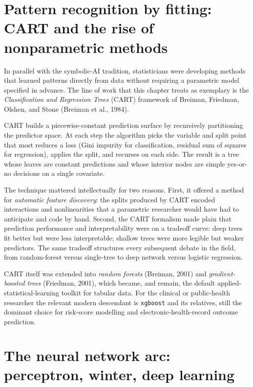 \documentclass[
  letterpaper,
  11pt]{scrbook}
\begin{document}
\section{Pattern recognition by fitting: CART and the rise of
nonparametric
methods}\label{pattern-recognition-by-fitting-cart-and-the-rise-of-nonparametric-methods}

In parallel with the symbolic-AI tradition, statisticians were
developing methods that learned patterns directly from data without
requiring a parametric model specified in advance. The line of work that
this chapter treats as exemplary is the \emph{Classification and
Regression Trees} (CART) framework of Breiman, Friedman, Olshen, and
Stone (Breiman et al., 1984).

CART builds a piecewise-constant prediction surface by recursively
partitioning the predictor space. At each step the algorithm picks the
variable and split point that most reduces a loss (Gini impurity for
classification, residual sum of squares for regression), applies the
split, and recurses on each side. The result is a tree whose leaves are
constant predictions and whose interior nodes are simple yes-or-no
decisions on a single covariate.

The technique mattered intellectually for two reasons. First, it offered
a method for \emph{automatic feature discovery}: the splits produced by
CART encoded interactions and nonlinearities that a parametric
researcher would have had to anticipate and code by hand. Second, the
CART formalism made plain that prediction performance and
interpretability were on a tradeoff curve: deep trees fit better but
were less interpretable; shallow trees were more legible but weaker
predictors. The same tradeoff structures every subsequent debate in the
field, from random-forest versus single-tree to deep network versus
logistic regression.

CART itself was extended into \emph{random forests} (Breiman, 2001) and
\emph{gradient-boosted trees} (Friedman, 2001), which became, and
remain, the default applied-statistical-learning toolkit for tabular
data. For the clinical or public-health researcher the relevant modern
descendant is \texttt{xgboost} and its relatives, still the dominant
choice for risk-score modelling and electronic-health-record outcome
prediction.

\section{The neural network arc: perceptron, winter, deep
learning}\label{the-neural-network-arc-perceptron-winter-deep-learning}
\end{document}
